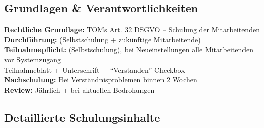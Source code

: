 \newpage

\subsection*{Grundlagen \& Verantwortlichkeiten}

\textbf{Rechtliche Grundlage:} TOMs Art. 32 DSGVO -- Schulung der Mitarbeitenden\\
\textbf{Durchführung:} \PraxisInhaberBezeichnung{} (Selbstschulung + zukünftige Mitarbeitende)\\
\textbf{Teilnahmepflicht:} \PraxisInhaberBezeichnung{} (Selbstschulung), bei Neueinstellungen alle Mitarbeitenden vor Systemzugang\\
\Dokumentation Teilnahmeblatt + Unterschrift + \enquote{Verstanden}-Checkbox\\
\textbf{Nachschulung:} Bei Verständnisproblemen binnen 2 Wochen\\
\textbf{Review:} Jährlich + bei aktuellen Bedrohungen

\subsection*{Detaillierte Schulungsinhalte}

